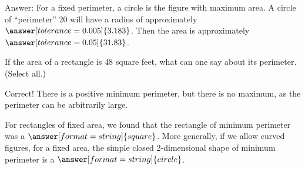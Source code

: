 \documentclass[nooutcomes]{ximera}
\begin{document}
\begin{problem}
\begin{problem}
\begin{problem}
\begin{problem}
Answer: For a fixed perimeter, a circle is the figure with maximum area.  A circle of ``perimeter'' 20 will have a radius of approximately $\answer[tolerance=0.005]{3.183}$. %
Then the area is approximately $\answer[tolerance=0.05]{31.83}$. %
\end{problem}
\end{problem}
\end{problem}
\end{problem}


\begin{problem}
If the area of a rectangle is 48 square feet, what can one say about its perimeter.  (Select all.)

\begin{selectAll}
\end{selectAll}

\begin{problem}
Correct!  There is a positive minimum perimeter, but there is no maximum, as the perimeter can be arbitrarily large.  

For rectangles of fixed area, we found that the rectangle of minimum perimeter was a 
$\answer[format=string]{square}$.  More generally, if we allow curved figures, for a fixed area, the simple closed 2-dimensional shape of minimum perimeter is a $\answer[format=string]{circle}$.  
\end{problem}
\end{problem}
\end{document}
